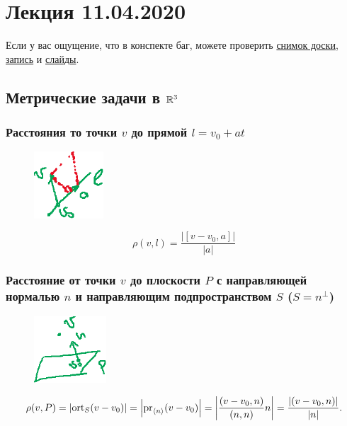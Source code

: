 \section{Лекция 11.04.2020} 

Если у вас ощущение, что в конспекте баг, можете проверить \href{https://www.dropbox.com/s/xsc0pnkmmre2yhe/LA_19-20_osn_Lecture27.svg?dl=0}{снимок доски}, \href{https://youtube.com/watch?v=6WN92vn1HMQ&list=PLEwK9wdS5g0oP4vhnGvQHPSqshML3Ze4P&index=4&t=0s}{запись} и \href{https://www.dropbox.com/s/wnao00nkxnvb9h3/LO_basics.pdf?dl=0}{слайды}.

\subsection{Метрические задачи в $\mathbb{R}^3$}

\subsubsection{Расстояния то точки $v$ до прямой $l = v_0 + at$}

{
\begin{figure}
    \vspace{-40pt}
    \includegraphics[height=2.5cm]{lecture27_drawing_1}
\end{figure}

\begin{equation*}
    \displaystyle
    \rho(v, l) = \frac{\left|[v - v_0, a]\right|}{|a|}
\end{equation*}
}


\subsubsection{Расстояние от точки $v$ до плоскости $P$ с направляющей нормалью $n$ и направляющим подпространством $S$ ($S = n^{\perp}$)}

{
\begin{figure}
    \vspace{-20pt}
    \includegraphics[height=2.5cm]{lecture27_drawing_2}
\end{figure}

\begin{equation*}
    \displaystyle
    \rho(v, P) = \left|\operatorname{\mathop{\mathrm{ort}}}_S (v - v_0)\right| = \left|\operatorname{\mathop{\mathrm{pr}}}_{\left< n \right>} (v - v_0)\right| = \left|\frac{(v - v_0, n)}{(n, n)} n\right| = \frac{|(v - v_0, n)|}{|n|}.
\end{equation*}
\vspace{1cm}
}


